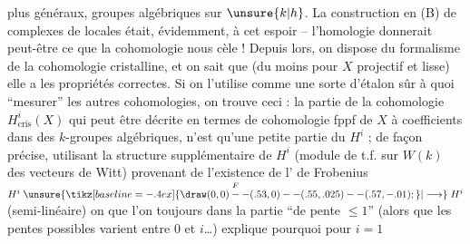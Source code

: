 plus généraux, groupes algébriques sur $\unsure{k|h}$. La construction en (B) de complexes de  locales était, évidemment,   à cet espoir -- l'homologie donnerait peut-être ce que la cohomologie nous cèle ! Depuis lors, on dispose du formalisme de la cohomologie cristalline, et on sait  que (du moins  pour $X$ projectif et lisse) elle a les propriétés correctes. Si on l'utilise comme une sorte d'étalon sûr à quoi ``mesurer'' les autres cohomologies, on trouve ceci : la partie de la cohomologie  $H^i_{\mathrm{cris}}(X)$ qui peut être décrite en termes de cohomologie fppf de $X$ à coefficients dans des $k$-groupes algébriques, n'est qu'une  petite partie du $H^i$ ; de façon précise, utilisant la structure  supplémentaire de $H^i$ (module de t.f. sur  $W(k)$ des vecteurs de Witt) provenant de l'existence de l' de Frobenius $H^i\mathrel{\mathop{\unsure{\tikz[baseline=-.4ex]{\draw (0,0)--(.53,0)--(.55,.025)--(.57,-.01);}|\longrightarrow}}\limits^{F}}H^i$ (semi-linéaire) on  que l'on  toujours dans la partie ``de pente $\leq 1$'' (alors que les pentes possibles varient entre $0$ et $i$\ldots)  explique pourquoi pour $i=1$
